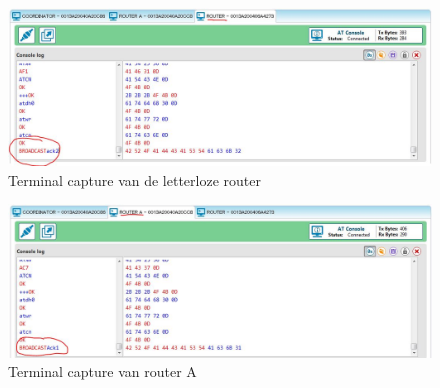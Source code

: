 \documentclass[12pt]{article}
\begin{document}
\begin{center}
\begin{figure}[h]
\includegraphics[scale=.7]{rout_capture.jpg}
\caption{Terminal capture van de letterloze router}
\label{fig:output5}
\end{figure}
\end{center}
\begin{center}
\begin{figure}[h]
\includegraphics[scale=.7]{routA_capture.jpg}
\caption{Terminal capture van router A}
\label{fig:output6}
\end{figure}
\end{center}
\clearpage
\end{document}
